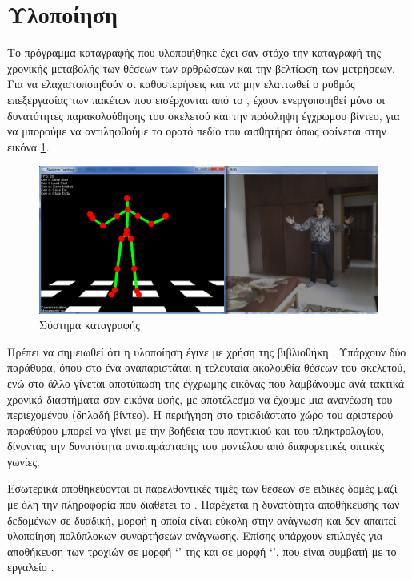 \section{Υλοποίηση}

Το πρόγραμμα καταγραφής που υλοποιήθηκε έχει σαν στόχο την καταγραφή της χρονικής μεταβολής των θέσεων των αρθρώσεων και την βελτίωση των μετρήσεων. Για να ελαχιστοποιηθούν οι καθυστερήσεις και να μην ελαττωθεί ο ρυθμός επεξεργασίας των πακέτων που εισέρχονται από το , έχουν ενεργοποιηθεί μόνο οι δυνατότητες παρακολούθησης του σκελετού και την πρόσληψη έγχρωμου βίντεο, για να μπορούμε να αντιληφθούμε το ορατό πεδίο του αισθητήρα όπως φαίνεται στην εικόνα \ref{fig:motion-capture}.

\begin{figure}[H]
    \centering
    \includegraphics[width=.9\textwidth]{kinect/fig/motion-capture.png}
    \caption{Σύστημα καταγραφής}
    \label{fig:motion-capture}
\end{figure}

Πρέπει να σημειωθεί ότι η υλοποίηση έγινε με χρήση της βιβλιοθήκη . Υπάρχουν δύο παράθυρα, όπου στο ένα αναπαριστάται η τελευταία ακολουθία θέσεων του σκελετού, ενώ στο άλλο γίνεται αποτύπωση της έγχρωμης εικόνας που λαμβάνουμε ανά τακτικά χρονικά διαστήματα σαν εικόνα υφής, με αποτέλεσμα να έχουμε μια ανανέωση του περιεχομένου (δηλαδή βίντεο). Η περιήγηση στο τρισδιάστατο χώρο του αριστερού παραθύρου μπορεί να γίνει με την βοήθεια του ποντικιού και του πληκτρολογίου, δίνοντας την δυνατότητα αναπαράστασης του μοντέλου από διαφορετικές οπτικές γωνίες.

Εσωτερικά αποθηκεύονται οι παρελθοντικές τιμές των θέσεων σε ειδικές δομές μαζί με όλη την πληροφορία που διαθέτει το . Παρέχεται η δυνατότητα αποθήκευσης των δεδομένων σε δυαδική, μορφή η οποία είναι εύκολη στην ανάγνωση και δεν απαιτεί υλοποίηση πολύπλοκων συναρτήσεων ανάγνωσης. Επίσης υπάρχουν επιλογές για αποθήκευση των τροχιών σε μορφή \lq {}\rq\; της  και σε μορφή \lq {}\rq  , που είναι συμβατή με το εργαλείο .
